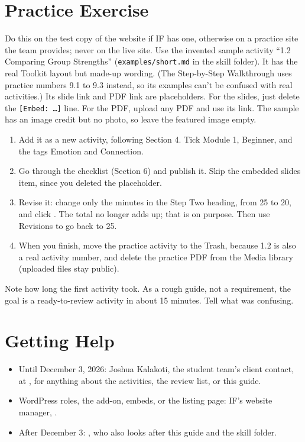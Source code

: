 \section{Practice Exercise}
Do this on the test copy of the website if IF has one, otherwise on a practice site the team provides; never on the live site. Use the invented sample activity ``1.2 Comparing Group Strengths'' (\texttt{examples/short.md} in the skill folder). It has the real Toolkit layout but made-up wording. (The Step-by-Step Walkthrough uses practice numbers 9.1 to 9.3 instead, so its examples can't be confused with real activities.) Its slide link and PDF link are placeholders. For the slides, just delete the \texttt{[Embed: \ldots]} line. For the PDF, upload any PDF and use its link. The sample has an image credit but no photo, so leave the featured image empty.
\begin{enumerate}
  \item Add it as a new activity, following Section 4. Tick Module 1, Beginner, and the tags Emotion and Connection.
  \item Go through the checklist (Section 6) and publish it. Skip the embedded slides item, since you deleted the placeholder.
  \item Revise it: change only the minutes in the Step Two heading, from 25 to 20, and click . The total no longer adds up; that is on purpose. Then use Revisions to go back to 25.
  \item When you finish, move the practice activity to the Trash, because 1.2 is also a real activity number, and delete the practice PDF from the Media library (uploaded files stay public).
\end{enumerate}
Note how long the first activity took. As a rough guide, not a requirement, the goal is a ready-to-review activity in about 15 minutes. Tell  what was confusing.

\section{Getting Help}
\begin{itemize}
  \item Until December 3, 2026: Joshua Kalakoti, the student team's client contact, at , for anything about the activities, the review list, or this guide.
  \item WordPress roles, the add-on, embeds, or the listing page: IF's website manager, .
  \item After December 3: , who also looks after this guide and the skill folder.
\end{itemize}

